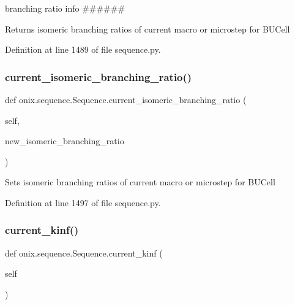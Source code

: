 branching ratio info \#\#\#\#\#\# 

\begin{DoxyVerb}Returns isomeric branching ratios of current macro or microstep
for BUCell\end{DoxyVerb}
 

Definition at line 1489 of file sequence.\+py.

\mbox{\label{classonix_1_1sequence_1_1Sequence_abb39ff0c6a2619aac3555dffeae25401}} 
\subsubsection{\texorpdfstring{current\+\_\+isomeric\+\_\+branching\+\_\+ratio()}{current\_isomeric\_branching\_ratio()}\hspace{0.1cm}{\footnotesize\ttfamily [2/2]}}
{\footnotesize\ttfamily def onix.\+sequence.\+Sequence.\+current\+\_\+isomeric\+\_\+branching\+\_\+ratio (\begin{DoxyParamCaption}\item[{}]{self,  }\item[{}]{new\+\_\+isomeric\+\_\+branching\+\_\+ratio }\end{DoxyParamCaption})}

\begin{DoxyVerb}Sets isomeric branching ratios of current macro or microstep
for BUCell\end{DoxyVerb}
 

Definition at line 1497 of file sequence.\+py.

\mbox{\label{classonix_1_1sequence_1_1Sequence_a6edc4c50dc07bb7d0c6dcfd5a644e28c}} 
\subsubsection{\texorpdfstring{current\+\_\+kinf()}{current\_kinf()}\hspace{0.1cm}{\footnotesize\ttfamily [1/2]}}
{\footnotesize\ttfamily def onix.\+sequence.\+Sequence.\+current\+\_\+kinf (\begin{DoxyParamCaption}\item[{}]{self }\end{DoxyParamCaption})}



